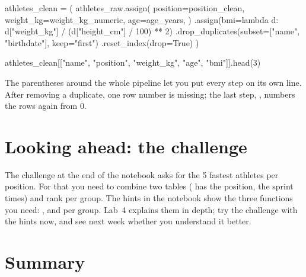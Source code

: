 \documentclass[11pt,a4paper]{article}
\begin{document}
\begin{python}[noout]
athletes_clean = (
    athletes_raw.assign(
        position=position_clean,
        weight_kg=weight_kg_numeric,
        age=age_years,
    )
    .assign(bmi=lambda d: d["weight_kg"] / (d["height_cm"] / 100) ** 2)
    .drop_duplicates(subset=["name", "birthdate"], keep="first")
    .reset_index(drop=True)
)
\end{python}
\begin{python}
athletes_clean[["name", "position", "weight_kg", "age", "bmi"]].head(3)
\end{python}

The parentheses around the whole pipeline let you put every step on its
own line. After removing a duplicate, one row number is missing; the last
step, , numbers the rows again from 0.

\section{Looking ahead: the challenge}

The challenge at the end of the notebook asks for the 5 fastest athletes
per position. For that you need to combine two tables
( has the position,  the sprint
times) and rank per group. The hints in the notebook show the three
functions you need: ,  and  per
group. Lab~4 explains them in depth; try the challenge with the hints
now, and see next week whether you understand it better.

\section{Summary}
\end{document}
